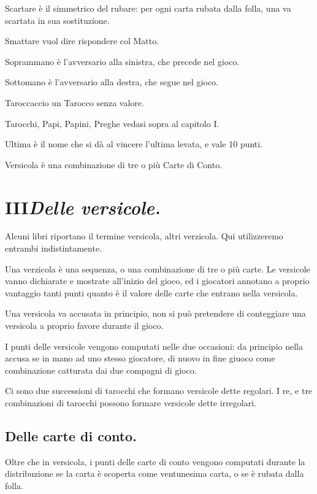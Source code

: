 \documentclass[11pt,a6paper]{article}
\begin{document}
\begin{list}
\item[Scartare] è il simmetrico del rubare: per ogni carta rubata dalla folla, una va scartata in sua sostituzione.
\item[Smattare] vuol dire rispondere col Matto.
\item[Soprammano] è l'avversario alla sinistra, che precede nel gioco.
\item[Sottomano] è l'avversario alla destra, che segue nel gioco.
\item[Taroccaccio] un Tarocco senza valore.
\item[Tarocchi, Papi, Papini, Preghe] vedasi sopra al capitolo I.
\item[Ultima] è il nome che si dà al vincere l'ultima levata, e vale 10 punti.
\item[Versicola] è una combinazione di tre o più Carte di Conto.
\end{list}

\section{III\hfill{\large\mdseries\slshape Delle versicole.}}

Alcuni libri riportano il termine versicola, altri verzicola.  Qui
utilizzeremo entrambi indistintamente.

Una verzicola è una sequenza, o una combinazione di tre o più carte.  Le
versicole vanno dichiarate e mostrate all'inizio del gioco, ed i giocatori
annotano a proprio vantaggio tanti punti quanto è il valore delle carte che
entrano nella versicola.

Una versicola va accusata in principio, non si può pretendere di conteggiare una
versicola a proprio favore durante il gioco.

I punti delle versicole vengono computati nelle due occasioni: da principio
nella accusa se in mano ad uno stesso giocatore, di nuovo in fine giuoco
come combinazione catturata dai due compagni di gioco.

Ci sono due successioni di tarocchi che formano versicole dette regolari.  I
re, e tre combinazioni di tarocchi possono formare versicole dette
irregolari.

\subsection{Delle carte di conto.}

Oltre che in versicola, i punti delle carte di conto vengono computati
durante la distribuzione se la carta è scoperta come ventunesima carta, o
se è rubata dalla folla.
\end{document}
